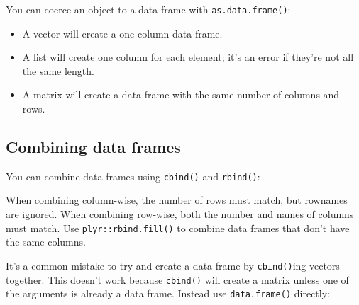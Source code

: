 You can coerce an object to a data frame with \texttt{as.data.frame()}:

\begin{itemize}
\item
  A vector will create a one-column data frame.
\item
  A list will create one column for each element; it's an error if
  they're not all the same length.
\item
  A matrix will create a data frame with the same number of columns and
  rows.
\end{itemize}

\subsection{Combining data frames}\label{combining-data-frames}

You can combine data frames using \texttt{cbind()} and \texttt{rbind()}:

\begin{Shaded}
\begin{Highlighting}[]
\NormalTok{(} \NormalTok{:}\NormalTok{))}
\NormalTok{(} \NormalTok{, } \NormalTok{))}
\end{Highlighting}
\end{Shaded}

When combining column-wise, the number of rows must match, but rownames
are ignored. When combining row-wise, both the number and names of
columns must match. Use \texttt{plyr::rbind.fill()} to combine data
frames that don't have the same columns.

It's a common mistake to try and create a data frame by
\texttt{cbind()}ing vectors together. This doesn't work because
\texttt{cbind()} will create a matrix unless one of the arguments is
already a data frame. Instead use \texttt{data.frame()} directly:

